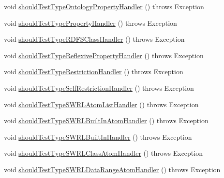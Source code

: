 \begin{DoxyCompactItemize}
\item 
void \hyperlink{classorg_1_1semanticweb_1_1owlapi_1_1contract_1_1_contract_rdfxml_parser_test_af94f0091d016c1aa388d6b8ed60abee1}{should\-Test\-Type\-Ontology\-Property\-Handler} ()  throws Exception 
\item 
void \hyperlink{classorg_1_1semanticweb_1_1owlapi_1_1contract_1_1_contract_rdfxml_parser_test_ac3ed79b62f622689d8e8f422476c3010}{should\-Test\-Type\-Property\-Handler} ()  throws Exception 
\item 
void \hyperlink{classorg_1_1semanticweb_1_1owlapi_1_1contract_1_1_contract_rdfxml_parser_test_af1e8896ee977832bc71f28171d1cf763}{should\-Test\-Type\-R\-D\-F\-S\-Class\-Handler} ()  throws Exception 
\item 
void \hyperlink{classorg_1_1semanticweb_1_1owlapi_1_1contract_1_1_contract_rdfxml_parser_test_a82b1690928a000778a41e55e346002ff}{should\-Test\-Type\-Reflexive\-Property\-Handler} ()  throws Exception 
\item 
void \hyperlink{classorg_1_1semanticweb_1_1owlapi_1_1contract_1_1_contract_rdfxml_parser_test_a10bf9ee01554b346a71adddb861dc4fc}{should\-Test\-Type\-Restriction\-Handler} ()  throws Exception 
\item 
void \hyperlink{classorg_1_1semanticweb_1_1owlapi_1_1contract_1_1_contract_rdfxml_parser_test_a4da285e8ba5a2fb61eb44cc3d963b5e5}{should\-Test\-Type\-Self\-Restriction\-Handler} ()  throws Exception 
\item 
void \hyperlink{classorg_1_1semanticweb_1_1owlapi_1_1contract_1_1_contract_rdfxml_parser_test_ad097daa052b6e0a3d1befd96e8cb5b96}{should\-Test\-Type\-S\-W\-R\-L\-Atom\-List\-Handler} ()  throws Exception 
\item 
void \hyperlink{classorg_1_1semanticweb_1_1owlapi_1_1contract_1_1_contract_rdfxml_parser_test_af86ad75c22b0af6e21992f89f019e3f8}{should\-Test\-Type\-S\-W\-R\-L\-Built\-In\-Atom\-Handler} ()  throws Exception 
\item 
void \hyperlink{classorg_1_1semanticweb_1_1owlapi_1_1contract_1_1_contract_rdfxml_parser_test_acc20eef41419223af8e98779b0bab8f1}{should\-Test\-Type\-S\-W\-R\-L\-Built\-In\-Handler} ()  throws Exception 
\item 
void \hyperlink{classorg_1_1semanticweb_1_1owlapi_1_1contract_1_1_contract_rdfxml_parser_test_adaf7202f1e5cbe198919d20fd34db493}{should\-Test\-Type\-S\-W\-R\-L\-Class\-Atom\-Handler} ()  throws Exception 
\item 
void \hyperlink{classorg_1_1semanticweb_1_1owlapi_1_1contract_1_1_contract_rdfxml_parser_test_ae3cc27992a3d6cc56af98cbba56900c0}{should\-Test\-Type\-S\-W\-R\-L\-Data\-Range\-Atom\-Handler} ()  throws Exception 

\end{DoxyCompactItemize}
